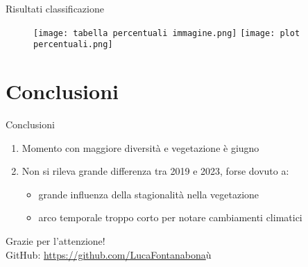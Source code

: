 \documentclass{beamer} %
\begin{document}
\begin{frame}{Risultati classificazione}
	\begin{figure}
    		\centering
    		\texttt{[image: tabella percentuali immagine.png]}
    		\texttt{[image: plot percentuali.png]}        
    		\label{fig:enter-label}
	\end{figure}
\end{frame}


\section{Conclusioni}


\begin{frame}{Conclusioni}
	\begin{enumerate}
        	\item Momento con maggiore diversità e vegetazione è giugno 
        	\item \pause Non si rileva grande differenza tra 2019 e 2023, forse dovuto a: \\
       			\begin{itemize}
            			\item \pause grande influenza della stagionalità nella vegetazione 
            			\item \pause arco temporale troppo corto per notare cambiamenti climatici
        		\end{itemize}
   	\end{enumerate}
\end{frame}


\begin{frame}{}
\centering
{\Huge Grazie per l'attenzione!} \\
\bigskip
\bigskip
GitHub: \url{https://github.com/LucaFontanabona}ù
\end{frame}
\end{document}
